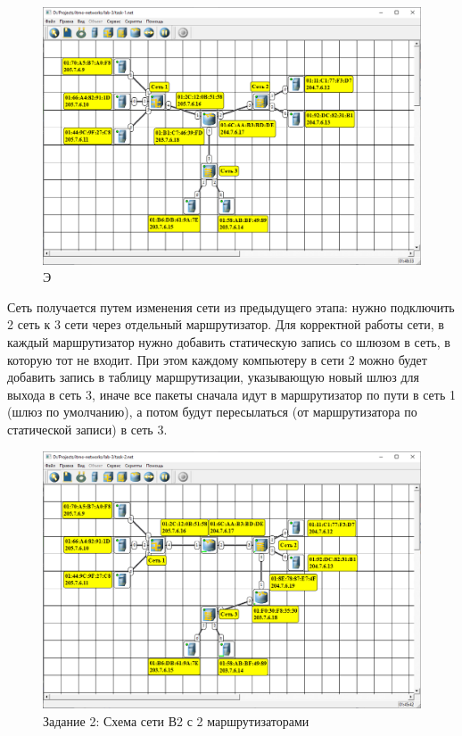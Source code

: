 \begin{figure}[H]
    \centering
    \includegraphics[width=1\linewidth]{res/task-1.png}
    \caption{Э}
    \label{fig:task-1}
\end{figure}


Сеть получается путем изменения сети из предыдущего этапа: нужно подключить 2 сеть к 3 сети через отдельный маршрутизатор. Для корректной работы сети, в каждый маршрутизатор нужно добавить статическую запись со шлюзом в сеть, в которую тот не входит. При этом каждому компьютеру в сети 2 можно будет добавить запись в таблицу маршрутизации, указывающую новый шлюз для выхода в сеть 3, иначе все пакеты сначала идут в маршрутизатор по пути в сеть 1 (шлюз по умолчанию), а потом будут пересылаться (от маршрутизатора по статической записи) в сеть 3.

\begin{figure}[H]
    \centering
    \includegraphics[width=1\linewidth]{res/task-2.png}
    \caption{Задание 2: Схема сети В2 с 2 маршрутизаторами}
    \label{fig:task-2}
\end{figure}


